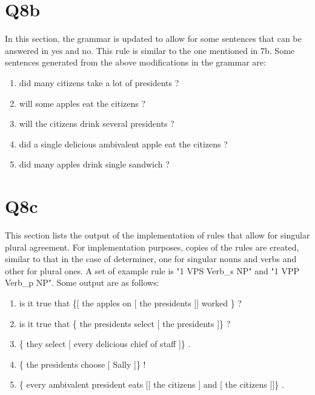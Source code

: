 \documentclass[12pt]{article}
\begin{document}
\section*{Q8b}
In this section, the grammar is updated to allow for some sentences that can be answered in yes and no. This rule is similar to the one mentioned in 7b. Some sentences generated from the above modifications in the grammar are:\\
\begin{enumerate}
	\item did  many  citizens  take  a  lot  of  presidents  ?  
	\item will  some  apples  eat  the  citizens  ?  
	\item will  the  citizens  drink  several  presidents  ?  
	\item did  a  single  delicious  ambivalent  apple  eat  the  citizens  ?  
	\item did  many  apples  drink  single  sandwich  ?  
\end{enumerate}
\section*{Q8c}
This section lists the output of the implementation of rules that allow for singular plural agreement. For implementation purposes, copies of the rules are created, similar to that in the case of determiner, one for singular nouns and verbs and other for plural ones. A set of example rule is "1\hspace{1cm}	VPS\hspace{1cm}	Verb\_s NP" and "1\hspace{1cm}	VPP\hspace{1cm}	Verb\_p NP". Some output are as follows:\\
\begin{enumerate}
	\item is  it  true  that \{[ the  apples  on [ the  presidents ]] worked \} ?  
	\item is  it  true  that \{ the  presidents  select [ the  presidents ]\} ? 
	\item \{ they  select [ every  delicious  chief  of  staff ]\} . 
	\item \{ the  presidents  choose [ Sally ]\} ! 
	\item \{ every  ambivalent  president  eats [[ the  citizens ] and [ the  citizens ]]\} . 
\end{enumerate}
\end{document}
